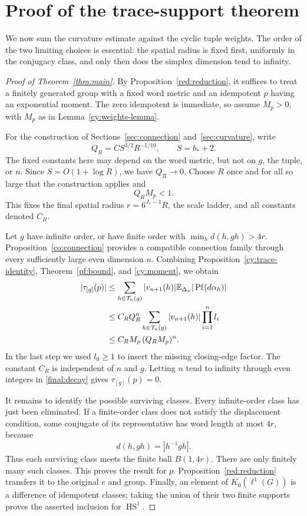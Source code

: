 \section{Proof of the trace-support theorem}\label{sec:conclusion}

We now sum the curvature estimate against the cyclic tuple weights.
The order of the two limiting choices is essential: the spatial radius
is fixed first, uniformly in the conjugacy class, and only then does
the simplex dimension tend to infinity.

\begin{proof}[Proof of Theorem~\ref{thm:main}]
By Proposition~\ref{red:reduction}, it suffices to treat a finitely
generated group with a fixed word metric and an idempotent $p$ having
an exponential moment. The zero idempotent is immediate, so assume
$M_p>0$, with $M_p$ as in Lemma~\ref{cy:weights-lemma}.

For the construction of Sections~\ref{sec:connection}
and~\ref{sec:curvature}, write
\[
 Q_R=C S^{3/2}R^{-1/10},\qquad S=b_*+2.
\]
The fixed constants here may depend on the word metric, but not on
$g$, the tuple, or $n$. Since $S=O(1+\log R)$, we have $Q_R\to0$.
Choose $R$ once and for all so large that the construction applies and
\begin{equation}\label{final:radius-choice}
 Q_RM_p<1.
\end{equation}
This fixes the final spatial radius $r=6^{J_*-1}R$, the scale ladder,
and all constants denoted $C_R$.

Let $g$ have infinite order, or have finite order with
$\min_h d(h,gh)>4r$. Proposition~\ref{co:connection} provides a
compatible connection family through every sufficiently large even
dimension $n$. Combining Proposition~\ref{cy:trace-identity},
Theorem~\ref{pf:bound}, and \eqref{cy:moment}, we obtain
\begin{align}
 |\tau_{[g]}(p)|
 &\le \sum_{h\in\mathcal T_n(g)}|v_{n+1}(h)|
               \mathbb E_{\Delta_n}|\operatorname{Pf}(d\alpha_h)|\notag\\
 &\le C_RQ_R^n\sum_{h\in\mathcal T_n(g)}|v_{n+1}(h)|
                                    \prod_{i=1}^n l_i\notag\\
 &\le C_RM_p\,(Q_RM_p)^n.\label{final:decay}
\end{align}
In the last step we used $l_0\ge1$ to insert the missing closing-edge
factor. The constant $C_R$ is independent of $n$ and $g$.
Letting $n$ tend to infinity through even integers in
\eqref{final:decay} gives $\tau_{[g]}(p)=0$.

It remains to identify the possible surviving classes. Every
infinite-order class has just been eliminated. If a finite-order class
does not satisfy the displacement condition, some conjugate of its
representative has word length at most $4r$, because
\[
 d(h,gh)=|h^{-1}gh|.
\]
Thus each surviving class meets the finite ball $B(1,4r)$. There are
only finitely many such classes. This proves the result for $p$.
Proposition~\ref{red:reduction} transfers it to the original $e$ and
group. Finally, an element of $K_0(\ell^1(G))$ is a difference of
idempotent classes; taking the union of their two finite supports
proves the asserted inclusion for $\operatorname{HS}^1$.
\end{proof}
